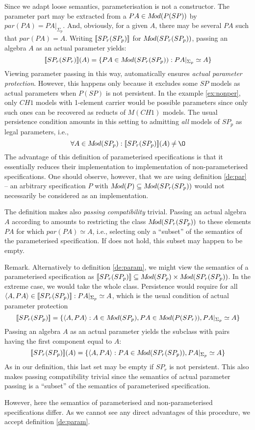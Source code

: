Since we adapt loose semantics, parameterisation is not a constructor.
The parameter part may be extracted from a $PA\in M\!od(P(SP))$ by $par(PA)=PA|_{\Sigma_p}$. And, obviously, for a given $A$, there may be several $PA$ such that $par(PA)=A$. Writing $[\![ SP_r(SP_p)]\!]$ for $M\!od(SP_r(SP_p))$, passing an algebra $A$ as an actual parameter yields: \begin{equation}\label{eq:apass}
[\![SP_r(SP_r)]\!](A) = \{PA\in M\!od(SP_r(SP_p)) : 
PA|_{\Sigma_p}\simeq A \}
\end{equation}
Viewing parameter passing in this way, automatically ensures {\em actual parameter protection}. However, this happens only because it excludes some $SP$ models as actual parameters when $P(SP)$ is not persistent. In the example \ref{ex:nonper}, only
$CH1$ models with 1-element carrier would be possible parameters since only such ones can be recovered as reducts of $M(CH1)$ models. The usual persistence condition amounts in this setting to admitting {\em all} models of $SP_p$ as legal parameters, i.e., \begin{equation}\label{eq:pers}
\forall A\in \Mod(SP_p) : \inter{SP_r(SP_p)}(A) \Not= \es \end{equation}
The advantage of this definition of parameterised specifications is that it essentially reduces their implementation to implementation of non-parameterised specifications. One should observe, however, that we are using definition \ref{de:par} -- an arbitrary
specification $P$ with $M\!od(P)\subseteq M\!od(SP_r(SP_p))$ would not necessarily be considered as an implementation. 

The definition makes also {\em passing compatibility} trivial. Passing an actual algebra $A$ according to  amounts to restricting the class $M\!od(SP_r(SP_p))$ to these elements $PA$ for which $par(PA)\simeq A$, i.e., selecting only a ``subset'' of the semantics of the parameterised specification. If  does not hold, this subset may happen to be empty. 

\begin{SREMARK}{Remark.}
Alternatively to definition \ref{de:param}, 
we might view the semantics of a parameterised specification as $[\![SP_r(SP_p)]\!]\subseteq M\!od(SP_p)\times M\!od(SP_r(SP_p))$. In the extreme case, we would take the whole class. Persistence would require for all $\langle A,PA\rangle\in[\![SP_r(SP_p)]\!] : 
PA|_{\Sigma_p} \simeq A$, which is the usual condition of actual parameter protection \[
[\![SP_r(SP_p)]\!] = \{\langle A,PA\rangle: A\in M\!od(SP_p), PA\in M\!od(P(SP_r)), 
PA|_{\Sigma_p}\simeq A\}
\]
Passing an algebra $A$ as an actual parameter yields the subclass with pairs having the first component equal to $A$: \[
[\![SP_r(SP_p)]\!](A) = \{\langle A,PA\rangle:PA\in M\!od(SP_r(SP_p)), 
PA|_{\Sigma_p}\simeq A\}
\]
As in our definition, this last set may be empty if $SP_r$ is not persistent.
This also makes passing compatibility trivial since the semantics of actual parameter passing is a ``subset'' of the semantics of parameterised specification.

However, here the semantics of parameterised and non-parameterised specifications differ. As we cannot see any direct advantages of this procedure, we accept definition \ref{de:param}. \end{SREMARK}
